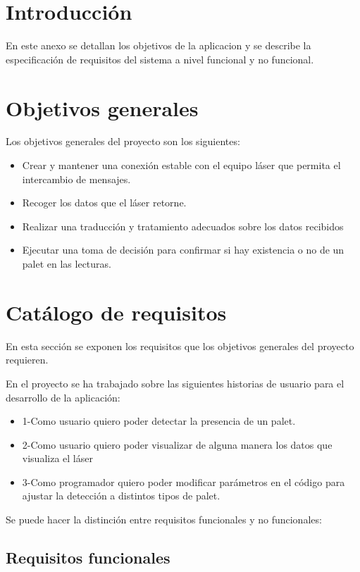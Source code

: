
\section{Introducción}
En este anexo se detallan los objetivos de la aplicacion y se describe la especificación de requisitos del sistema a nivel funcional y no funcional.

\section{Objetivos generales}
Los objetivos generales del proyecto son los siguientes:

\begin{itemize}
\tightlist
\item
  Crear y mantener una conexión estable con el equipo láser que permita el intercambio de mensajes.
\item
  Recoger los datos que el láser retorne.
\item
  Realizar una traducción y tratamiento adecuados sobre los datos recibidos
\item
  Ejecutar una toma de decisión para confirmar si hay existencia o no de un palet en las lecturas.
\end{itemize}

\section{Catálogo de requisitos}
En esta sección se exponen los requisitos que los objetivos generales del proyecto requieren.

En el proyecto se ha trabajado sobre las siguientes historias de usuario para el desarrollo de la aplicación:
\begin{itemize}
\item 1-Como usuario quiero poder detectar la presencia de un palet.
\item 2-Como usuario quiero poder visualizar de alguna manera los datos que visualiza el láser
\item 3-Como programador quiero poder modificar parámetros en el código para ajustar la detección a distintos tipos de palet.
\end{itemize}

Se puede hacer la distinción entre requisitos funcionales y no funcionales:\\

\subsection{Requisitos funcionales}


